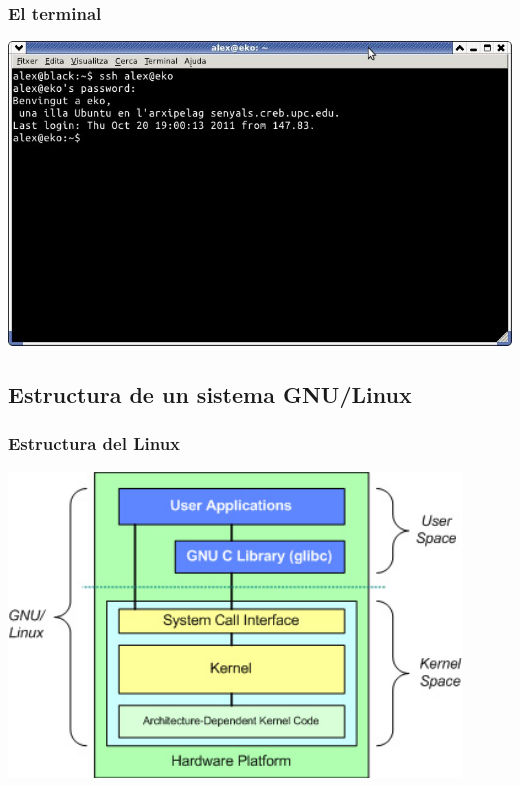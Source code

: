 \documentclass[colorlinks,10pt]{beamer}
\begin{document}
\begin{frame}
      \frametitle{El terminal} 
      \begin{center}
        \includegraphics[width=1\textwidth]{figs/terminal} \\
      \end{center}
\end{frame}




\subsection{Estructura de un sistema GNU/Linux}



\begin{frame}
  \frametitle{Estructura del Linux}
  \begin{center}
    \includegraphics[width=0.9\textwidth]{figs/kernela} \\
  \end{center}
\end{frame}
\end{document}
